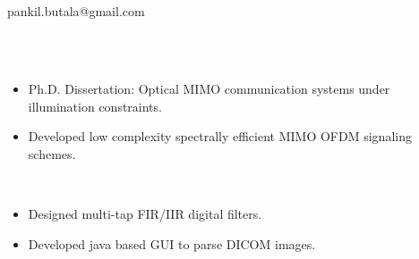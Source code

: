 
\thispagestyle{empty}

\begin{center}
\\
\vspace{0.3in}
\\
pankil.butala@gmail.com
\end{center}
\vspace{0.1in}
\vspace{0.05in}\\
 \hfill {}\\
\begin{itemize}[noitemsep,topsep=0.25em,leftmargin=1.25em]
	\item Ph.D. Dissertation: Optical MIMO communication systems under illumination constraints.
	\item Developed low complexity spectrally efficient MIMO OFDM signaling schemes.
\end{itemize}
\vspace{0.05in}
  \hfill {}\\
\begin{itemize}[noitemsep,topsep=0.25em,leftmargin=1.25em]
	\item Designed multi-tap FIR/IIR digital filters.
	\item Developed java based GUI to parse DICOM images.
\end{itemize}
\vspace{0.05in}
  \hfill {}\\

